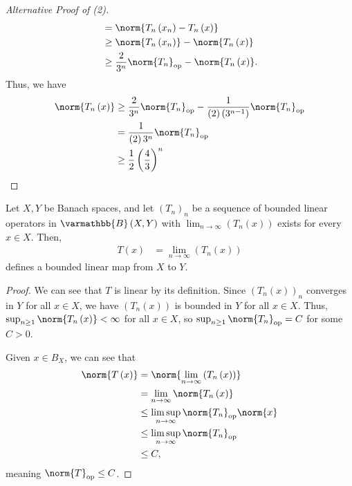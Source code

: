 \documentclass[10pt]{mypackage}
\renewcommand*{\mathbb}[1]{\varmathbb{#1}}
\newcommand{\B}{\mathbb{B}}
\begin{document}
\begin{proof}[Alternative Proof of (2)]
\begin{align*}
                                                                     &= \norm{T_n\left(x_n\right) - T_n\left(x\right)}\\
                                                                     &\geq \norm{T_n\left(x_n\right)} - \norm{T_n\left(x\right)}\\
                                                                     &\geq \frac{2}{3^n}\norm{T_n}_{\text{op}} - \norm{T_n\left(x\right)}.
    \end{align*}
    Thus, we have
    \begin{align*}
      \norm{T_n\left(x\right)} &\geq \frac{2}{3^n}\norm{T_n}_{\text{op}} - \frac{1}{\left(2\right)\left(3^{n-1}\right)}\norm{T_n}_{\text{op}}\\
                               &= \frac{1}{\left(2\right)3^{n}}\norm{T_n}_{\text{op}}\\
                               &\geq \frac{1}{2}\left(\frac{4}{3}\right)^{n}
    \end{align*}
  \end{proof}
  \begin{corollary}
    Let $X,Y$ be Banach spaces, and let $\left(T_n\right)_n$ be a sequence of bounded linear operators in $\B\left(X,Y\right)$ with $\lim_{n\rightarrow\infty}\left(T_n\left(x\right)\right)$ exists for every $x\in X$. Then,
    \begin{align*}
      T\left(x\right) &= \lim_{n\rightarrow\infty}\left(T_n\left(x\right)\right)
    \end{align*}
    defines a bounded linear map from $X$ to $Y$.
  \end{corollary}
  \begin{proof}
    We can see that $T$ is linear by its definition. Since $\left(T_n\left(x\right)\right)_n$ converges in $Y$ for all $x\in X$, we have $\left(T_n\left(x\right)\right)$ is bounded in $Y$ for all $x\in X$. Thus, $\sup_{n\geq 1}\norm{T_n\left(x\right)} < \infty$ for all $x\in X$, so $\sup_{n\geq 1}\norm{T_n}_{\text{op}} = C$ for some $C > 0$.\newline

    Given $x\in B_X$, we can see that
    \begin{align*}
      \norm{T\left(x\right)} &= \norm{\lim_{n\rightarrow\infty}\left(T_{n}\left(x\right)\right)}\\
                             &= \lim_{n\rightarrow\infty}\norm{T_n\left(x\right)}\\
                             &\leq \limsup_{n\rightarrow\infty}\norm{T_n}_{\text{op}}\norm{x}\\
                             &\leq \limsup_{n\rightarrow\infty}\norm{T_n}_{\text{op}}\\
                             &\leq C,
    \end{align*}
    meaning $\norm{T}_{\text{op}} \leq C$.
  \end{proof}
\end{document}
